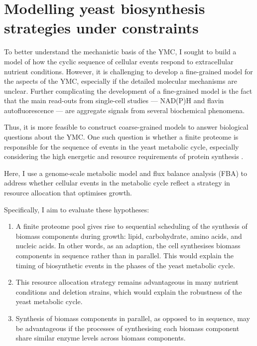 \chapter{Modelling yeast biosynthesis strategies under constraints}
\label{ch:model}

To better understand the mechanistic basis of the YMC, I sought to build a model of how the cyclic sequence of cellular events respond to extracellular nutrient conditions.
However, it is challenging to develop a fine-grained model for the aspects of the YMC,
especially if the detailed molecular mechanisms are unclear.
Further complicating the development of a fine-grained model is the fact that the main read-outs from single-cell studies --- NAD(P)H and flavin autofluorescence --- are aggregate signals from several biochemical phenomena.

Thus, it is more feasible to construct coarse-grained models to answer biological questions about the YMC\@.
One such question is whether a finite proteome is responsible for the sequence of events in the yeast metabolic cycle, especially considering the high energetic and resource requirements of protein synthesis \parencite{oneillEukaryoticCellBiology2020,zylstraMetabolicDynamicsCell2022}.

Here, I use a genome-scale metabolic model and flux balance analysis (FBA) to address whether cellular events in the metabolic cycle reflect a strategy in resource allocation that optimises growth.

Specifically, I aim to evaluate these hypotheses:
\begin{enumerate}
  \item A finite proteome pool gives rise to sequential scheduling of the synthesis of biomass components during growth: lipid, carbohydrate, amino acids, and nucleic acids.
        In other words, as an adaption, the cell synthesises biomass components in sequence rather than in parallel.
        This would explain the timing of biosynthetic events in the phases of the yeast metabolic cycle.
  \item This resource allocation strategy remains advantageous in many nutrient conditions and deletion strains,
        which would explain the robustness of the yeast metabolic cycle.
  \item Synthesis of biomass components in parallel, as opposed to in sequence, may be advantageous if the processes of synthesising each biomass component share similar enzyme levels across biomass components.
\end{enumerate}

